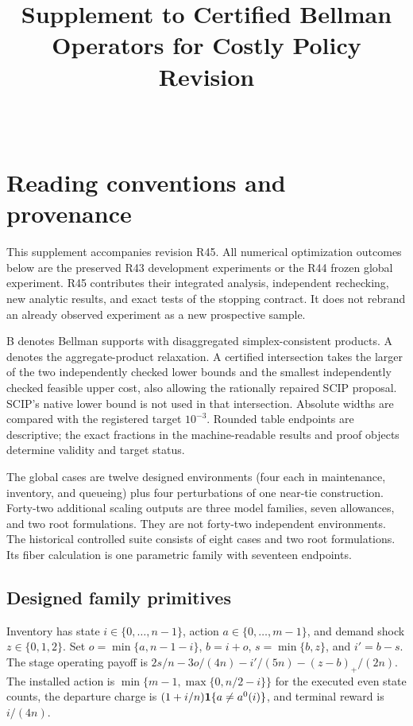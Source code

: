 
\begin{frontmatter}\title{Supplement to Certified Bellman Operators for Costly Policy Revision}\begin{aug}\author[id=au1,addressref={add1}]{~}\address[id=add1]{}\end{aug}\end{frontmatter}
\section{Reading conventions and provenance}
This supplement accompanies revision R45. All numerical optimization outcomes below are the preserved R43 development experiments or the R44 frozen global experiment. R45 contributes their integrated analysis, independent rechecking, new analytic results, and exact tests of the stopping contract. It does not rebrand an already observed experiment as a new prospective sample.

B denotes Bellman supports with disaggregated simplex-consistent products. A denotes the aggregate-product relaxation. A certified intersection takes the larger of the two independently checked lower bounds and the smallest independently checked feasible upper cost, also allowing the rationally repaired SCIP proposal. SCIP's native lower bound is not used in that intersection. Absolute widths are compared with the registered target $10^{-3}$. Rounded table endpoints are descriptive; the exact fractions in the machine-readable results and proof objects determine validity and target status.

The global cases are twelve designed environments (four each in maintenance, inventory, and queueing) plus four perturbations of one near-tie construction. Forty-two additional scaling outputs are three model families, seven allowances, and two root formulations. They are not forty-two independent environments. The historical controlled suite consists of eight cases and two root formulations. Its fiber calculation is one parametric family with seventeen endpoints.


\subsection{Designed family primitives}
Inventory has state $i\in\{0,\ldots,n-1\}$, action $a\in\{0,\ldots,m-1\}$, and demand shock $z\in\{0,1,2\}$. Set $o=\min\{a,n-1-i\}$, $b=i+o$, $s=\min\{b,z\}$, and $i'=b-s$. The stage operating payoff is $2s/n-3o/(4n)-i'/(5n)-(z-b)_+/(2n)$. The installed action is $\min\{m-1,\max\{0,n/2-i\}\}$ for the executed even state counts, the departure charge is $(1+i/n)\mathbf 1\{a\ne a^0(i)\}$, and terminal reward is $i/(4n)$.

